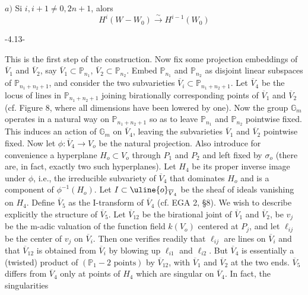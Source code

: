 $a)$ Si $i,i+1\ne0,2n+1$,   alors
\[H^i(W-W_0)\xrightarrow{\sim}H^{i-1}(W_0)\]
\begin{center}-4.13-\end{center}
This is the first step of the construction. Now fix some projection embeddings of $\overline V_1$ and $\overline V_2$, say $\overline V_1\subset\mathbb P_{n_1}$, $\overline V_2\subset\mathbb P_{n_2}$. Embed $\mathbb P_{n_1}$ and $\mathbb P_{n_2}$ as disjoint linear subspaces of $\mathbb P_{n_1+n_2+1}$, and consider the two subvarieties $\overline V_i\subset\mathbb P_{n_1+n_2+1}$. Let $\overline V_4$ be the locus of lines in $\mathbb P_{n_1+n_2+1}$ joining birationally corresponding points of $\overline V_1$ and $\overline V_2$ (cf. Figure 8, where all dimensions have been lowered by one). Now the group $\mathbb G_m$ operates in a natural way on $\mathbb P_{n_1+n_2+1}$ so as to leave $\mathbb P_{n_1}$ and $\mathbb P_{n_2}$ pointwise fixed. This induces an action of $\mathbb G_m$ on $\overline V_4$, leaving the subvarieties $\overline V_1$ and $\overline V_2$ pointwise fixed. Now let $\phi:\overline V_4\longrightarrow V_o$ be the natural projection. Also introduce for convenience a hyperplane $H_o\subset V_o$ through $P_1$ and $P_2$ and left fixed by $\sigma_o$ (there are, in fact, exactly two such hyperplanes). Let $H_4$ be its proper inverse image under $\phi$, i.e., the irreducible subvariety of $\overline V_4$ that dominates $H_o$ and is a component of $\phi^{-1}(H_o)$. Let $I\subset\uline{o}_{\overline V_4}$ be the sheaf of ideals vanishing on $H_4$. Define $\overline V_5$ as the I-transform of $\overline V_4$ (cf. EGA 2, \S8). We wish to describe explicitly the structure of $\overline V_5$. Let $\overline V_{12}$ be the birational joint of $\overline V_1$ and $\overline V_2$, be $v_j$ be the m-adic valuation of the function field $k(V_o)$ centered at $P_j$, and let $\ell_{ij}$ be the center of $v_j$ on $\overline V_i$. Then one verifies readily that $\ell_{ij}$ are lines on $\overline V_i$ and that $\overline V_{12}$ is obtained from $\overline V_i$ by blowing up $\ell_{i1}$ and $\ell_{i2}$. But $\overline V_4$ is essentially a (twisted) product of $(\mathbb P_1-2\text{ points})$ by $\overline V_{12}$, with $\overline V_1$ and $\overline V_2$ at the two ends. $\overline V_5$ differs from $\overline V_4$ only at points of $H_4$ which are singular on $\overline V_4$. In fact, the singularities

